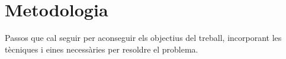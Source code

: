 \chapter{Metodologia}

Passos que cal seguir per aconseguir els objectius del treball, incorporant les tècniques i eines necessàries per resoldre el problema.

